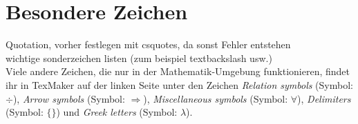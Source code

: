 \section{Besondere Zeichen}%
Quotation, vorher festlegen mit csquotes, da sonst Fehler entstehen\\%
wichtige sonderzeichen listen (zum beispiel textbackslash usw.)\\%
Viele andere Zeichen, die nur in der Mathematik-Umgebung funktionieren, findet ihr in TexMaker auf der linken Seite unter den Zeichen \emph{Relation symbols} (Symbol: $\div$), \emph{Arrow symbols} (Symbol: $\Rightarrow$), \emph{Miscellaneous symbols} (Symbol: $\forall$), \emph{Delimiters} (Symbol: $\lbrace\rbrace$) und \emph{Greek letters} (Symbol: $\lambda$).%